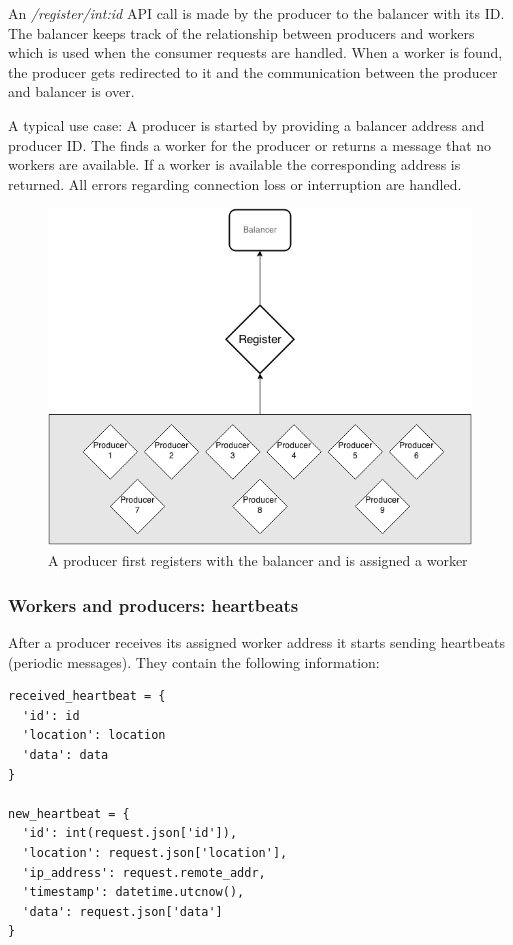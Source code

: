 \documentclass{sigchi}
\begin{document}
An  {\it /register/int:id} API call is made by the producer to the balancer with its ID. The balancer keeps track of the relationship between producers and workers which is used when the consumer requests are handled. When a worker is found, the producer gets redirected to it and the communication between the producer and balancer is over.

A typical use case:
A producer is started by providing a balancer address and producer ID. The finds a worker for the producer or returns a message that no workers are available. If a worker is available the corresponding address is returned. All errors regarding connection loss or interruption are handled.

\begin{figure}[!h]
\centering
\includegraphics[width=0.9\columnwidth]{img/producer}
\caption{A producer first registers with the balancer and is assigned a worker}
\label{fig:producer}
\end{figure}

\subsubsection{Workers and producers: heartbeats}

After a producer receives its assigned worker address it starts sending heartbeats (periodic messages). They contain the following information:

\vspace*{\baselineskip}
\begin{lstlisting}[caption={Heartbeat format}, mathescape, upquote=true]
received_heartbeat = {
  'id': id
  'location': location
  'data': data
}

new_heartbeat = {
  'id': int(request.json['id']),
  'location': request.json['location'],
  'ip_address': request.remote_addr,
  'timestamp': datetime.utcnow(),
  'data': request.json['data']
}
\end{lstlisting}
\end{document}
